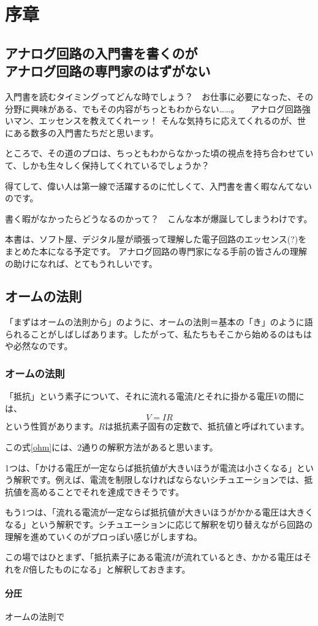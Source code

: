 \part{序章}

\chapter{アナログ回路の入門書を書くのが\\アナログ回路の専門家のはずがない}


入門書を読むタイミングってどんな時でしょう？　お仕事に必要になった、その分野に興味がある、でもその内容がちっともわからない……。
\newline
　アナログ回路強いマン、エッセンスを教えてくれーッ！
\newline
そんな気持ちに応えてくれるのが、世にある数多の入門書たちだと思います。
\newline

ところで、その道のプロは、ちっともわからなかった頃の視点を持ち合わせていて、しかも生々しく保持してくれているでしょうか？

得てして、偉い人は第一線で活躍するのに忙しくて、入門書を書く暇なんてないのです。

書く暇がなかったらどうなるのかって？　こんな本が爆誕してしまうわけです。
\newline

本書は、ソフト屋、デジタル屋が頑張って理解した電子回路のエッセンス(?)をまとめた本になる予定です。
アナログ回路の専門家になる手前の皆さんの理解の助けになれば、とてもうれしいです。


\chapter{オームの法則}
「まずはオームの法則から」のように、オームの法則＝基本の「き」のように語られることがしばしばあります。したがって、私たちもそこから始めるのはもはや必然なのです。

\section{オームの法則}
「抵抗」という素子について、それに流れる電流$I$とそれに掛かる電圧$V$の間には、
\begin{equation}\label{ohm}
V =IR
\end{equation}
という性質があります。$R$は抵抗素子固有の定数で、抵抗値と呼ばれています。

この式\ref{ohm}には、2通りの解釈方法があると思います。

1つは、「かける電圧が一定ならば抵抗値が大きいほうが電流は小さくなる」という解釈です。例えば、電流を制限しなければならないシチュエーションでは、抵抗値を高めることでそれを達成できそうです。

もう1つは、「流れる電流が一定ならば抵抗値が大きいほうがかかる電圧は大きくなる」という解釈です。シチュエーションに応じて解釈を切り替えながら回路の理解を進めていくのがプロっぽい感じがしますね。

この場ではひとまず、「抵抗素子にある電流$I$が流れているとき、かかる電圧はそれを$R$倍したものになる」と解釈しておきます。

\subsection{分圧}

オームの法則で